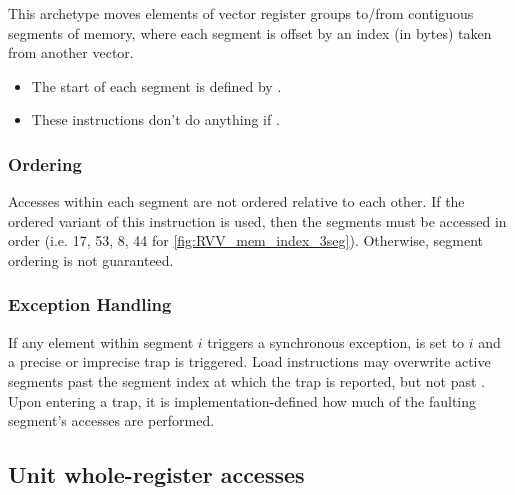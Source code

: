 This archetype moves elements of  vector register groups to/from contiguous segments of memory,
where each segment is offset by an index (in bytes) taken from another vector.

\begin{itemize}
\item The start of each segment is defined by .
\item These instructions don't do anything if .
\end{itemize}

\subsubsection*{Ordering}
Accesses within each segment are not ordered relative to each other.
If the ordered variant of this instruction is used, then the segments must be accessed in order (i.e. 17, 53, 8, 44 for \cref{fig:RVV_mem_index_3seg}).
Otherwise, segment ordering is not guaranteed.


\subsubsection*{Exception Handling}
If any element within segment $i$ triggers a synchronous exception,  is set to $i$ and a precise or imprecise trap is triggered.
Load instructions may overwrite active segments past the segment index at which the trap is reported, but not past \cite[Section 7.7]{specification-RVV-v1.0}.
Upon entering a trap, it is implementation-defined how much of the faulting segment's accesses are performed.

\pagebreak
\subsection{Unit whole-register accesses}

